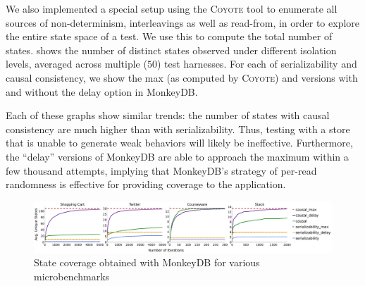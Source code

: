 We also implemented a special setup using the \textsc{Coyote} tool \cite{coyote-web} 
to enumerate all sources of non-determinism, interleavings as well as
read-from, in order to explore the entire state space of a
test. We use this to compute the total number of states. 
shows the number of distinct 
states observed under different isolation levels, averaged across multiple ($50$) test
harnesses. For each of serializability and causal consistency, we show the max
(as computed by \textsc{Coyote}) and versions with and without the delay option
in MonkeyDB. 

Each of these graphs show similar trends: the number of states with
causal consistency are much higher than with serializability. Thus, testing with a
store that is unable to generate weak behaviors will likely be ineffective.
Furthermore, the ``delay'' versions of MonkeyDB are able to approach the 
maximum within a few thousand attempts, implying that MonkeyDB's strategy of
per-read randomness is effective for providing coverage to the application.


\begin{figure}[h]
	
	\centering
	
	\includegraphics[width=1.0\textwidth]{Sources/sql/plots/random_avg.pdf}
	
	\caption{State coverage obtained with MonkeyDB for various microbenchmarks}
	
	\label{fig:micro_dfs}
\end{figure}

%
%
%
%
%
%
%	
%	
%	
%	
%
%
%	
%	
%	
%	
%
%	
%	
%	
%	


